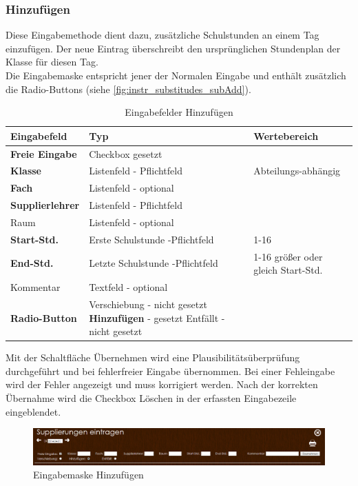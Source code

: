 \subsubsection{Hinzufügen}\label{sec:instr_admin_sub_add}
Diese Eingabemethode dient dazu, zusätzliche Schulstunden an einem Tag einzufügen. Der neue Eintrag überschreibt den ursprünglichen Stundenplan der Klasse für diesen Tag.\\
Die Eingabemaske entspricht jener der Normalen Eingabe und enthält zusätzlich die Radio-Buttons (siehe \autoref{fig:instr_substitudes_subAdd}).
\begin{table}[H]
\centering
\begin{tabular}{p{3 cm}p{6 cm}p{5 cm}}
   \toprule
   \textbf{Eingabefeld} & \textbf{Typ} & \textbf{Wertebereich} \\
   \midrule
          \textbf{Freie Eingabe} & Checkbox \newline gesetzt & \\
          \hline
          \textbf{Klasse} & Listenfeld - Pflichtfeld & Abteilungs-abhängig \\
          \hline
          \textbf{Fach} & Listenfeld - optional & \\
          \hline
          \textbf{Supplierlehrer} & Listenfeld - Pflichtfeld & \\
          \hline
          Raum & Listenfeld - optional & \\
          \hline
          \textbf{Start-Std.} & Erste Schulstunde  -Pflichtfeld & 1-16 \\
		  \hline
          \textbf{End-Std.} & Letzte Schulstunde -Pflichtfeld & 1-16 \newline größer oder gleich Start-Std.\\
          \hline
          Kommentar & Textfeld - optional & \\
          \hline
          \textbf{Radio-Button} & Verschiebung - nicht gesetzt\newline 
          \textbf{Hinzufügen} - gesetzt \newline Entfällt - nicht gesetzt & \\
   \bottomrule
\end{tabular}
\caption{Eingabefelder Hinzufügen}
\end{table}
Mit der Schaltfläche Übernehmen wird eine Plausibilitätsüberprüfung durchgeführt und bei fehlerfreier Eingabe übernommen. Bei einer Fehleingabe wird der Fehler angezeigt und muss korrigiert werden. Nach der korrekten Übernahme wird die Checkbox Löschen in der erfassten Eingabezeile eingeblendet.
\begin{figure}[H]
\centering
\includegraphics[keepaspectratio=true, width=17cm]{images/screenshots/substitudes_add.png}
\caption{Eingabemaske Hinzufügen}
\label{fig:instr_substitudes_subAdd}
\end{figure}
